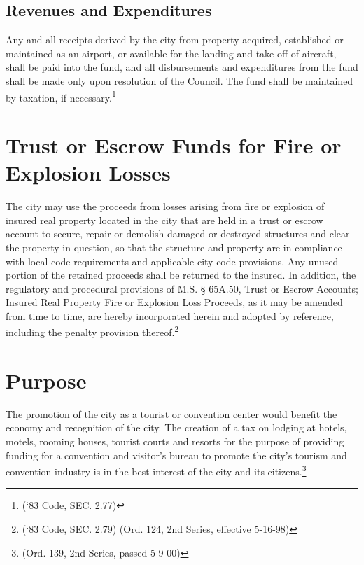 \subsection{Revenues and Expenditures}
Any and all receipts derived by the city from property acquired, established or maintained as an airport, or available for the landing and take-off of aircraft, shall be paid into the fund, and all disbursements and expenditures from the fund shall be made only upon resolution of the Council.  The fund shall be maintained by taxation, if necessary.\footnote{(‘83 Code, SEC. 2.77)}

\section{Trust or Escrow Funds for Fire or Explosion Losses}
The city may use the proceeds from losses arising from fire or explosion of insured real property located in the city that are held in a trust or escrow account to secure, repair or demolish damaged or destroyed structures and clear the property in question, so that the structure and property are in compliance with local code requirements and applicable city code provisions.  Any unused portion of the retained proceeds shall be returned to the insured.  In addition, the regulatory and procedural provisions of M.S. §  65A.50, Trust or Escrow Accounts; Insured Real Property Fire or Explosion Loss Proceeds, as it may be amended from time to time, are hereby incorporated herein and adopted by reference, including the penalty provision thereof.\footnote{(‘83 Code, SEC. 2.79)  (Ord. 124, 2nd Series, effective 5-16-98)}


\setcounter{section}{14}
\section{Purpose}
The promotion of the city as a tourist or convention center would benefit the economy and recognition of the city.  The creation of a tax on lodging at hotels, motels, rooming houses, tourist courts and resorts for the purpose of providing funding for a convention and visitor’s bureau to promote the city’s tourism and convention industry is in the best interest of the city and its citizens.\footnote{(Ord. 139, 2nd Series, passed 5-9-00)}


